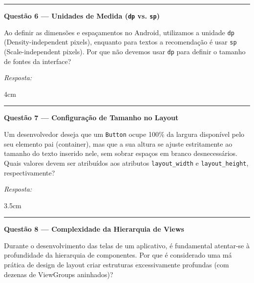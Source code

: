 \documentclass[12pt]{article}
\begin{document}
\vspace{0.6cm}
\noindent\rule{\textwidth}{0.8pt}
\vspace{0.3cm}

\noindent\textbf{Questão 6 — Unidades de Medida (\texttt{dp} vs. \texttt{sp})}

\vspace{0.2cm}
\noindent
Ao definir as dimensões e espaçamentos no Android, utilizamos a unidade \texttt{dp} (Density-independent pixels), enquanto para textos a recomendação é usar \texttt{sp} (Scale-independent pixels). Por que não devemos usar \texttt{dp} para definir o tamanho de fontes da interface?

\vspace{0.3cm}
\noindent\textit{Resposta:}
\begin{resposta}{4cm}
\end{resposta}

\vspace{0.6cm}
\noindent\rule{\textwidth}{0.8pt}
\vspace{0.3cm}

\noindent\textbf{Questão 7 — Configuração de Tamanho no Layout}

\vspace{0.2cm}
\noindent
Um desenvolvedor deseja que um \texttt{Button} ocupe 100\% da largura disponível pelo seu elemento pai (container), mas que a sua altura se ajuste estritamente ao tamanho do texto inserido nele, sem sobrar espaços em branco desnecessários. Quais valores devem ser atribuídos aos atributos \texttt{layout\_width} e \texttt{layout\_height}, respectivamente?

\vspace{0.3cm}
\noindent\textit{Resposta:}
\begin{resposta}{3.5cm}
\end{resposta}

\vspace{0.6cm}
\noindent\rule{\textwidth}{0.8pt}
\vspace{0.3cm}

\noindent\textbf{Questão 8 — Complexidade da Hierarquia de Views}

\vspace{0.2cm}
\noindent
Durante o desenvolvimento das telas de um aplicativo, é fundamental atentar-se à profundidade da hierarquia de componentes. Por que é considerado uma má prática de design de layout criar estruturas excessivamente profundas (com dezenas de ViewGroups aninhados)?
\end{document}

